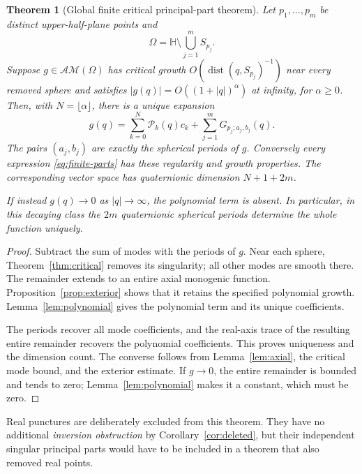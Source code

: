 \documentclass[11pt,a4paper]{article}
\numberwithin{equation}{section}
\newtheorem{theorem}{Theorem}[section]
\theoremstyle{definition}
\theoremstyle{remark}
\newcommand{\HH}{\mathbb H}
\newcommand{\AM}{\mathcal{AM}}
\newcommand{\dist}{\operatorname{dist}}
\begin{document}
\begin{theorem}[Global finite critical principal-part theorem]
\label{thm:finite-parts}
Let $p_1,\ldots,p_m$ be distinct upper-half-plane points and
\[
 \Omega=\HH\setminus\bigcup_{j=1}^mS_{p_j}.
\]
Suppose $g\in\AM(\Omega)$ has critical growth $O(\dist(q,S_{p_j})^{-1})$
near every removed sphere and satisfies
$|g(q)|=O((1+|q|)^\alpha)$ at infinity, for $\alpha\ge0$.
Then, with $N=\lfloor\alpha\rfloor$, there is a unique expansion
\begin{equation}
 g(q)=\sum_{k=0}^N\mathcal P_k(q)c_k
                    +\sum_{j=1}^mG_{p_j;a_j,b_j}(q).
 \label{eq:finite-parts}
\end{equation}
The pairs $(a_j,b_j)$ are exactly the spherical periods of $g$.
Conversely every expression \eqref{eq:finite-parts} has these
regularity and growth properties. The corresponding vector space has
quaternionic dimension $N+1+2m$.

If instead $g(q)\to0$ as $|q|\to\infty$, the polynomial term is absent.
In particular, in this decaying class the $2m$ quaternionic spherical
periods determine the whole function uniquely.
\end{theorem}
\begin{proof}
Subtract the sum of modes with the periods of $g$. Near each sphere,
Theorem~\ref{thm:critical} removes its singularity; all other modes are
smooth there. The remainder extends to an entire axial monogenic
function. Proposition~\ref{prop:exterior} shows that it retains the
specified polynomial growth. Lemma~\ref{lem:polynomial} gives the
polynomial term and its unique coefficients.

The periods recover all mode coefficients, and the real-axis trace of
the resulting entire remainder recovers the polynomial coefficients.
This proves uniqueness and the dimension count. The converse follows
from Lemma~\ref{lem:axial}, the critical mode bound, and the exterior
estimate. If $g\to0$, the entire remainder is bounded and tends to zero;
Lemma~\ref{lem:polynomial} makes it a constant, which must be zero.
\end{proof}
Real punctures are deliberately excluded from this theorem. They have
no additional \emph{inversion obstruction} by Corollary~\ref{cor:deleted},
but their independent singular principal parts would have to be included
in a theorem that also removed real points.
\end{document}
